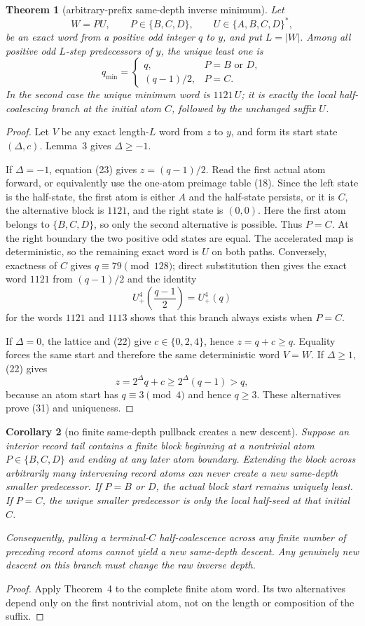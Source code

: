 \documentclass[11pt]{article}
\newtheorem{theorem}{Theorem}
\newtheorem{corollary}[theorem]{Corollary}
\newcommand{\Up}{U_+}
\begin{document}
\begin{theorem}[arbitrary-prefix same-depth inverse minimum]
Let
\[
 W=PU,
 \qquad P\in\{B,C,D\},
 \qquad U\in\{A,B,C,D\}^*,
 \tag{30}
\]
be an exact word from a positive odd integer $q$ to $y$, and put
$L=|W|$.  Among all positive odd $L$-step predecessors of $y$, the
unique least one is
\[
 \boxed{
 q_{\min}=\begin{cases}
 q,&P=B\text{ or }D,\\[1mm]
 (q-1)/2,&P=C.
 \end{cases}}
 \tag{31}
\]
In the second case the unique minimum word is $1121\,U$; it is exactly
the local half-coalescing branch at the initial atom $C$, followed by the
unchanged suffix $U$.
\end{theorem}

\begin{proof}
Let $V$ be any exact length-$L$ word from $z$ to $y$, and form its start
state $(\Delta,c)$.  Lemma~3 gives $\Delta\geq-1$.

If $\Delta=-1$, equation (23) gives $z=(q-1)/2$.  Read the first actual
atom forward, or equivalently use the one-atom preimage table (18).
Since the left state is the half-state, the first atom is either $A$ and
the half-state persists, or it is $C$, the alternative block is $1121$,
and the right state is $(0,0)$.  Here the first atom belongs to
$\{B,C,D\}$, so only the second alternative is possible.  Thus $P=C$.
At the right boundary the two positive odd states are equal.  The
accelerated map is deterministic, so the remaining exact word is $U$ on
both paths.  Conversely, exactness of $C$ gives
$q\equiv79\pmod {128}$; direct substitution then gives the exact word
$1121$ from $(q-1)/2$ and the identity
\[
 \Up^4\!\left(\frac{q-1}{2}\right)=\Up^4(q)
 \tag{32}
\]
for the words $1121$ and $1113$ shows that this branch always exists
when $P=C$.

If $\Delta=0$, the lattice and (22) give $c\in\{0,2,4\}$, hence
$z=q+c\geq q$.  Equality forces the same start and therefore the same
deterministic word $V=W$.  If $\Delta\geq1$, (22) gives
\[
 z=2^\Delta q+c\geq2^\Delta(q-1)>q,
 \tag{33}
\]
because an atom start has $q\equiv3\pmod4$ and hence $q\geq3$.
These alternatives prove (31) and uniqueness.
\end{proof}

\enlargethispage{3\baselineskip}
\begin{corollary}[no finite same-depth pullback creates a new descent]
Suppose an interior record tail contains a finite block beginning at a
nontrivial atom $P\in\{B,C,D\}$ and ending at any later atom boundary.
Extending the block across arbitrarily many intervening record atoms can
never create a new same-depth smaller predecessor.  If $P=B$ or $D$, the
actual block start remains uniquely least.  If $P=C$, the unique smaller
predecessor is only the local half-seed at that initial $C$.

Consequently, pulling a terminal-$C$ half-coalescence across any finite
number of preceding record atoms cannot yield a new same-depth descent.
Any genuinely new descent on this branch must change the raw inverse
depth.
\end{corollary}

\begin{proof}
Apply Theorem~4 to the complete finite atom word.  Its two alternatives
depend only on the first nontrivial atom, not on the length or composition
of the suffix.
\end{proof}
\end{document}
